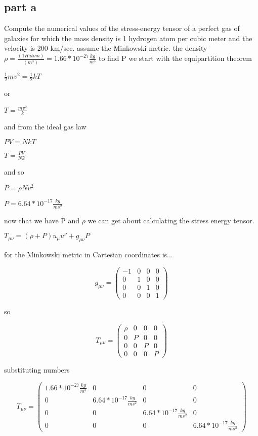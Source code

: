 \documentclass{article}
\begin{document}
\subsection{part a}
Compute the numerical values of the stress-energy tensor of a perfect gas of galaxies for which the mass density is 1 hydrogen atom per cubic meter and the velocity is 200 km/sec. assume the Minkowski metric.
the density $\rho=\frac{(1 H atom)}{(m^{3})}=1.66*10^{-27} \frac{kg}{m^{3}}$ 
to find P we start with the equipartition theorem

$\frac{1}{2}mv^{2}=\frac{1}{2}kT$ 

or 

$T=\frac{mv^{2}}{k}$

and from the ideal gas law

$PV=NkT$

$T=\frac{PV}{Nk}$

and so 

$P=\rho Nv^{2}$

$P=6.64*10^{-17} \frac{kg}{ms^{2}}$

now that we have P and $\rho$ we can get about calculating the stress energy tensor. 

$T_{\mu\nu}=(\rho+P)u_{\mu}u^{\nu}+g_{\mu\nu}P$

for the Minkowski metric in Cartesian coordinates is...

\[ g_{\mu\nu} = \left( \begin{array}{cccc}
-1 & 0 & 0 & 0 \\
0 & 1 & 0 & 0 \\
0 & 0 & 1 & 0 \\
0 & 0 & 0 & 1 \end{array} \right)\] 

so 

\[ T_{\mu\nu} = \left( \begin{array}{cccc}
\rho & 0 & 0 & 0 \\
0 & P & 0 & 0 \\
0 & 0 & P & 0 \\
0 & 0 & 0 & P \end{array} \right)\] 

substituting numbers

\[ T_{\mu\nu} = \left( \begin{array}{cccc}
1.66*10^{-27}\frac{kg}{m^{3}} & 0 & 0 & 0 \\
0 & 6.64*10^{-17}\frac{kg}{ms^{2}} & 0 & 0 \\
0 & 0 & 6.64*10^{-17}\frac{kg}{ms^{2}} & 0 \\
0 & 0 & 0 & 6.64*10^{-17}\frac{kg}{ms^{2}} \end{array} \right)\] 
\end{document}
